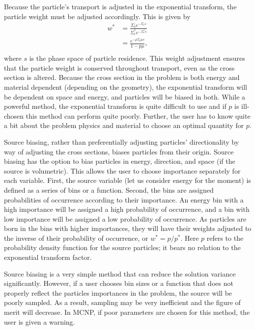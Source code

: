 Because the particle's transport is adjusted in the exponential transform, the
particle weight must be adjusted accordingly. This is given by
%
\begin{equation*}
  \begin{split}
  w^* &= \frac{\Sigma_t e^{-\Sigma_t s}}{\Sigma_t^* e^{-\Sigma_t^* s}} \\
      &= \frac{e^{-\rho \Sigma_t \mu s}}{1-p\mu}, \\
  \end{split}
  \label{eq:ExTrnsWt}
\end{equation*}
%
where $s$ is the phase space of particle residence. This weight adjustment
ensures that the particle weight is conserved throughout transport, even as
the cross section is altered. Because the cross section in the problem is both
energy and material dependent (depending on the geometry), the exponential
transform will be dependent on space and energy, and particles will be biased in
both. While a powerful method, the exponential transform is quite difficult to
use and if $p$ is ill-chosen this method can perform quite poorly. Further,
the user has to know quite a bit about the problem physics and material to choose an
optimal quantity for $p$.

Source biasing, rather than preferentially adjusting particles' directionality
by way of adjusting the cross sections, biases particles from their origin.
Source biasing has the option to bias particles in energy, direction, and space
(if the source is volumetric). This allows the user to choose importance
separately for each variable. First, the source variable (let us consider
energy for the moment) is defined as a series of bins or a function. Second, the bins are
assigned probabilities of occurrence according to their importance. An energy bin
with a high importance will be assigned a high probability of occurrence, and a
bin with low importance will be assigned a low probability of occurrence. As
particles are born in the bins with higher importances, they will have their
weights adjusted to the inverse of their probability of occurrence, or $w^* =
p/p^*$. Here $p$ refers to the probability density function for the source
particles; it bears no relation to the exponential transform factor.

Source biasing is a very simple method that can reduce the solution variance
significantly. However, if a user chooses bin sizes or a function that does not
properly reflect the particles importances in the problem, the source will be
poorly sampled. As a result, sampling may be very inefficient and the figure of
merit will decrease. In MCNP, if poor parameters are chosen for this method, the
user is given a warning.

